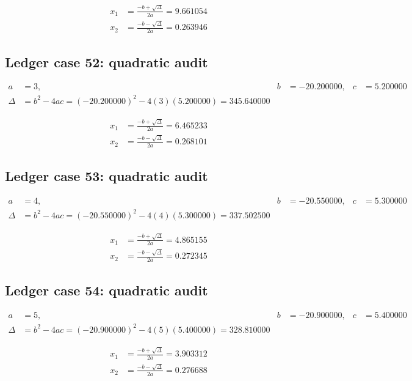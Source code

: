 \documentclass[11pt,a4paper]{article}
\begin{document}
\begin{align}
x_1 &= \frac{-b+\sqrt{\Delta}}{2a} = 9.661054 \\
x_2 &= \frac{-b-\sqrt{\Delta}}{2a} = 0.263946
\end{align}

\newpage

\subsection{Ledger case 52: quadratic audit}
\begin{align}
a &= 3, & b &= -20.200000, & c &= 5.200000 \\
\Delta &= b^2-4ac = (-20.200000)^2 - 4(3)(5.200000) = 345.640000
\end{align}

\begin{align}
x_1 &= \frac{-b+\sqrt{\Delta}}{2a} = 6.465233 \\
x_2 &= \frac{-b-\sqrt{\Delta}}{2a} = 0.268101
\end{align}

\subsection{Ledger case 53: quadratic audit}
\begin{align}
a &= 4, & b &= -20.550000, & c &= 5.300000 \\
\Delta &= b^2-4ac = (-20.550000)^2 - 4(4)(5.300000) = 337.502500
\end{align}

\begin{align}
x_1 &= \frac{-b+\sqrt{\Delta}}{2a} = 4.865155 \\
x_2 &= \frac{-b-\sqrt{\Delta}}{2a} = 0.272345
\end{align}

\subsection{Ledger case 54: quadratic audit}
\begin{align}
a &= 5, & b &= -20.900000, & c &= 5.400000 \\
\Delta &= b^2-4ac = (-20.900000)^2 - 4(5)(5.400000) = 328.810000
\end{align}

\begin{align}
x_1 &= \frac{-b+\sqrt{\Delta}}{2a} = 3.903312 \\
x_2 &= \frac{-b-\sqrt{\Delta}}{2a} = 0.276688
\end{align}
\end{document}
